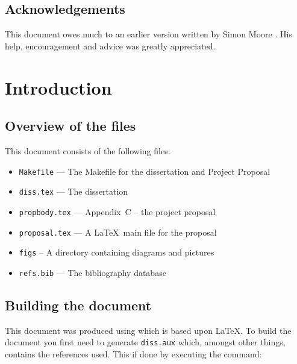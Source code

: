 \documentclass[12pt,twoside,notitlepage]{report}
\begin{document}
\newpage
\section*{Acknowledgements}

This document owes much to an earlier version written by Simon Moore
\cite{Moore95}.  His help, encouragement and advice was greatly
appreciated.


\cleardoublepage        %

\setcounter{page}{1}
\pagestyle{headings}

\chapter{Introduction}

\section{Overview of the files}

This document consists of the following files:

\begin{itemize}
\item {\tt Makefile} --- The Makefile for the dissertation and Project Proposal
\item {\tt diss.tex} --- The dissertation
\item {\tt propbody.tex} --- Appendix~C  -- the project proposal
\item {\tt proposal.tex}  --- A \LaTeX\ main file for the proposal
\item{\tt figs} -- A directory containing diagrams and pictures
\item{\tt refs.bib} --- The bibliography database
\end{itemize}

\section{Building the document}

This document was produced using \LaTeXe which is based upon
\LaTeX\cite{Lamport86}.  To build the document you first need to
generate {\tt diss.aux} which, amongst other things, contains the
references used.  This if done by executing the command:
\end{document}
